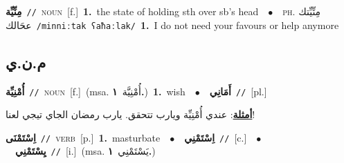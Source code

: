 \documentclass[10pt,a4paper,twoside]{article} %
\begin{document}
\begin{multicols}{2}
{\setlength\topsep{0pt}\textbf{\foreignlanguage{arabic}{مِنِّيِّة}}\ {\color{gray}\texttt{//}\color{black}}\ \textsc{noun}\ [f.]\ \textbf{1.}~the state of holding sth over sb's head\ \ $\bullet$\ \ \textsc{ph.} \color{gray} \foreignlanguage{arabic}{مِنِّيِّتك عحَالك}\color{black}\ {\color{gray}\texttt{/{\sffamily minniːtak ʕaħaːlak}/}\color{black}}\ \textbf{1.}~I do not need your favours or help anymore\ } \vspace{2mm}

\vspace{-3mm}
\subsection*{\color{blue}\foreignlanguage{arabic}{م.ن.ي}\color{blue}{}} 

{\setlength\topsep{0pt}\textbf{\foreignlanguage{arabic}{أُمْنِيِّة}}\ {\color{gray}\texttt{//}\color{black}}\ \textsc{noun}\ [f.]\ \color{gray}(msa. \foreignlanguage{arabic}{أُمْنِيَّة}~\foreignlanguage{arabic}{\textbf{١.}})\color{black}\ \textbf{1.}~wish\ \ $\bullet$\ \ \setlength\topsep{0pt}\textbf{\foreignlanguage{arabic}{أَمَانِي}}\ {\color{gray}\texttt{//}\color{black}}\ [pl.]\  \begin{flushright}\color{gray}\foreignlanguage{arabic}{\textbf{\underline{\foreignlanguage{arabic}{أمثلة}}}: عندي أُمْنِيِّة ويارب تتحقق. يارب رمضان الجاي تيجي لعنا!}\end{flushright}\color{black}} \vspace{2mm}

{\setlength\topsep{0pt}\textbf{\foreignlanguage{arabic}{اِسْتَمْنَى}}\ {\color{gray}\texttt{//}\color{black}}\ \textsc{verb}\ [p.]\ \textbf{1.}~masturbate\ \ $\bullet$\ \ \setlength\topsep{0pt}\textbf{\foreignlanguage{arabic}{اِسْتَمْنِي}}\ {\color{gray}\texttt{//}\color{black}}\ [c.]\ \ $\bullet$\ \ \setlength\topsep{0pt}\textbf{\foreignlanguage{arabic}{يِسْتَمْنِي}}\ {\color{gray}\texttt{//}\color{black}}\ [i.]\ \color{gray}(msa. \foreignlanguage{arabic}{يَسْتَمْنِي}~\foreignlanguage{arabic}{\textbf{١.}})\color{black}\ } \vspace{2mm}


\end{multicols}
\end{document}

